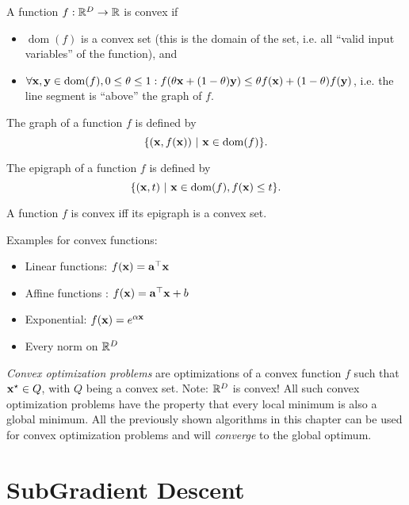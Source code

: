 \begin{definition}
A function \(f: \mathbb{R}^D \to \mathbb{R}\) is convex if
\begin{itemize}
\item \(\operatorname{dom}(f)\) is a convex set (this is the domain of the set, i.e. all ``valid input variables'' of the function), and
\item \(\forall \boldsymbol{\mathrm{x}}, \boldsymbol{\mathrm{y}} \in \operatorname{dom}(f), 0 \leq \theta \leq 1: f(\theta \boldsymbol{\mathrm{x}} + (1-\theta) \boldsymbol{\mathrm{y}}) \leq \theta f(\boldsymbol{\mathrm{x}}) + (1-\theta) f(\boldsymbol{\mathrm{y}})\), i.e. the line segment is ``above'' the graph of \(f\).
\end{itemize}
\end{definition}

\begin{definition}
The graph of a function \(f\) is defined by
\[
\{(\matr{x}, f(\matr{x}))\ |\ \matr{x} \in \operatorname{dom}(f)\}.
\]
\end{definition}

\begin{definition}
The epigraph of a function \(f\) is defined by
\[
\{(\boldsymbol{\mathrm{x}}, t)\ |\ \boldsymbol{\mathrm{x}} \in \operatorname{dom}(f), f(\boldsymbol{\mathrm{x}}) \leq t\}.
\]

A function \(f\) is convex iff its epigraph is a convex set.
\end{definition}

Examples for convex functions:
\begin{itemize}
\item Linear functions: \(f(\boldsymbol{\mathrm{x}}) = \boldsymbol{\mathrm{a}}^\top \boldsymbol{\mathrm{x}}\)
\item Affine functions : \(f(\boldsymbol{\mathrm{x}}) = \boldsymbol{\mathrm{a}}^\top \boldsymbol{\mathrm{x}} + b\)
\item Exponential: \(f(\boldsymbol{\mathrm{x}}) = e^{\alpha \boldsymbol{\mathrm{x}}}\)
\item Every norm on \(\mathbb{R}^D\)
\end{itemize}


\emph{Convex optimization problems} are optimizations of a convex function \(f\) such that \(\boldsymbol{\mathrm{x}}^\star \in Q\), with \(Q\) being a convex set. Note: \(\mathbb{R}^D\) is convex! All such convex optimization problems have the property that every local minimum is also a global minimum. All the previously shown algorithms in this chapter can be used for convex optimization problems and will \emph{converge} to the global optimum.

\section{SubGradient Descent}

 
